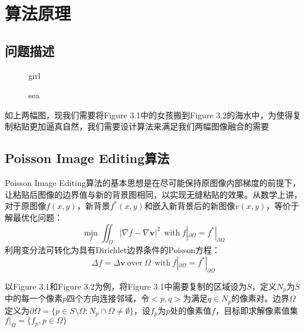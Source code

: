 \documentclass[14pt]{scrartcl} %
\begin{document}
	\section{算法原理}
	
	\subsection{问题描述}
	\begin{figure}[h] %
		\begin{minipage}[t]{0.5\linewidth}
			\centering
			\caption{girl}
		\end{minipage}%
		\begin{minipage}[t]{0.5\linewidth}
			\centering
			\caption{sea}
		\end{minipage}
	\end{figure}
	如上两幅图，现我们需要将Figure 3.1中的女孩搬到Figure 3.2的海水中，为使得复制粘贴更加逼真自然，我们需要设计算法来满足我们两幅图像融合的需要
	
	\subsection{Poisson Image Editing算法\cite{perez2003poisson}}
	
	Poisson Image Editing算法的基本思想是在尽可能保持原图像内部梯度的前提下，让粘贴后图像的边界值与新的背景图相同，以实现无缝粘贴的效果。从数学上讲，对于原图像$f(x,y)$，新背景$f^*(x,y)$和嵌入新背景后的新图像$v(x,y)$，等价于解最优化问题：
	\begin{equation}
		\min\limits_f \iint _\Omega |\nabla f-\nabla \boldsymbol v |^2 \ \ \mathrm{with}\ f|_{\partial \Omega}=f^*|_{\partial \Omega}
	\end{equation}
	利用变分法可转化为具有Dirichlet边界条件的Poisson方程：
	\begin{equation}
		\Delta f= \Delta \boldsymbol v\ \mathrm{over}\ \Omega \ \ \mathrm{with}\ f|_{\partial \Omega}=f^*|_{\partial \Omega}
	\end{equation}
	
	
	以Figure 3.1和Figure 3.2为例，将Figure 3.1中需要复制的区域设为$S$，定义$N_p$为$S$中的每一个像素$p$四个方向连接邻域，令$<p,q>$为满足$q\in N_p$的像素对。边界$\Omega$定义为$\partial \Omega =\{p\in S\setminus \Omega: N_p \cap \Omega \neq \emptyset \}$，设$f_p$为$p$处的像素值$f$，目标即求解像素值集$f|_\Omega =\{f_p,p\in \Omega\}$
	
\end{document}
